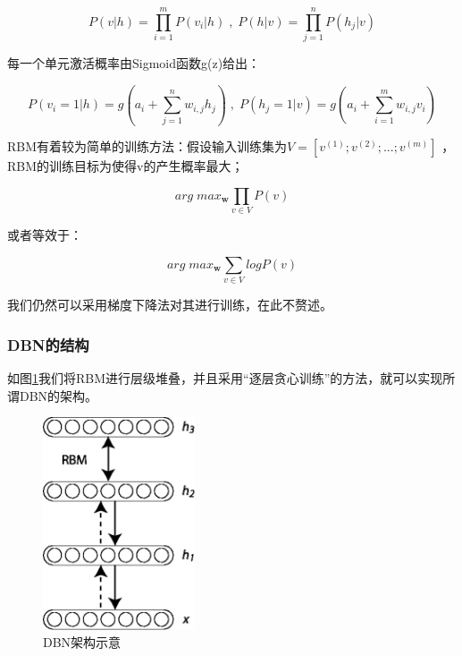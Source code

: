 \begin{equation}
P(v|h) = \prod^m_{i=1} P(v_i|h)\;,\; P(h|v) = \prod^n_{j=1} P(h_j|v)
\end{equation}

每一个单元激活概率由Sigmoid函数g(z)给出：

\begin{equation}
P(v_i=1|h) = g(a_i + \sum^n_{j=1} w_{i,j}h_j )\;,\; P(h_j =1|v) = g(a_i + \sum^m_{i=1} w_{i,j}v_i )
\end{equation}

RBM有着较为简单的训练方法：假设输入训练集为$V = [v^{(1)};v^{(2)};...;v^{(m)}]$ ，RBM的训练目标为使得v的产生概率最大；

\begin{equation}
arg\; max_{\mathbf{w}} \prod_{v\in V} P(v)
\end{equation}

或者等效于：

\begin{equation}
arg\; max_{\mathbf{w}} \sum_{v\in V} log P(v)
\end{equation}

我们仍然可以采用梯度下降法对其进行训练，在此不赘述。

\subsubsection{DBN的结构}

如图\ref{fig:dbn}我们将RBM进行层级堆叠，并且采用“逐层贪心训练”的方法，就可以实现所谓DBN的架构。\cite{hinton2006fast}

\begin{figure}[htbp]
   \centering
   \includegraphics[width=0.4\textwidth]{DeepBeliefNetwork.png} %
   \caption{DBN架构示意}
   \label{fig:dbn}
\end{figure}

